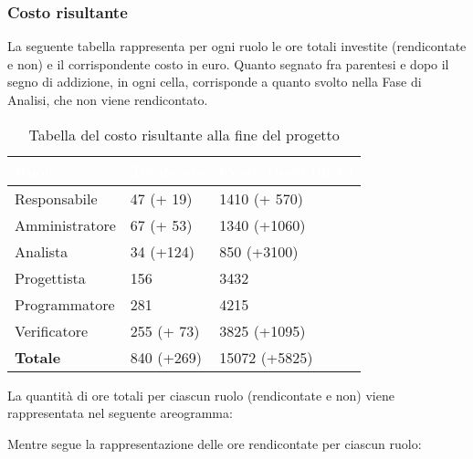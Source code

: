 \clearpage

\subsubsection{Costo risultante}
La seguente tabella rappresenta per ogni ruolo le ore totali investite (rendicontate e non) e il corrispondente costo in euro. Quanto segnato fra parentesi e dopo il segno di addizione, in ogni cella, corrisponde a quanto svolto nella Fase di Analisi, che non viene rendicontato.
{
\renewcommand{\arraystretch}{2}
\begin{longtable}{ C{3cm} C{2cm} C{4cm}}
\caption{Tabella del costo risultante alla fine del progetto}\\

\textcolor{white}{\textbf{Ruolo}} & 
\textcolor{white}{\textbf{Totale ore}} & 
\textcolor{white}{\textbf{Costo ruolo (in \euro{})}}\\	
\endhead
        
Responsabile    &  47 (+ 19) &  1410 (+ 570) \\
Amministratore  &  67 (+ 53) &  1340 (+1060) \\
Analista        &  34 (+124) &   850 (+3100) \\
Progettista     & 156        &  3432         \\
Programmatore   & 281        &  4215         \\
Verificatore    & 255 (+ 73) &  3825 (+1095) \\
\textbf{Totale} & 840 (+269) & 15072 (+5825) \\	
        	
\end{longtable}
}

La quantità di ore totali per ciascun ruolo (rendicontate e non) viene rappresentata nel seguente areogramma:
\begin{center}
\end{center}

Mentre segue la rappresentazione delle ore rendicontate per ciascun ruolo:
\begin{center}
\end{center}